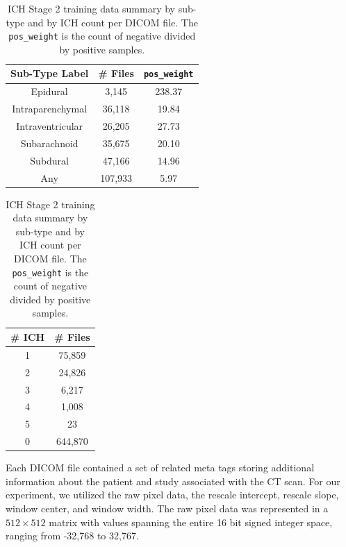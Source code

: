 \documentclass[runningheads]{llncs}
\begin{document}
\begin{table}[htbp]
    \centering
    \caption{ICH Stage 2 training data summary by sub-type and by ICH count per DICOM file. The \texttt{pos\_weight} is the count of negative divided by positive samples.}
    \label{tab:train_by_count}

    \begin{minipage}{.49\linewidth}
        \centering
        \tabcolsep=0.1cm
        \begin{tabular}{|c|c|c|}
            \hline
            Sub-Type Label & \# Files & \texttt{pos\_weight} \\ \hline
            Epidural & 3,145 & 238.37 \\
            Intraparenchymal &  36,118 & 19.84 \\
            Intraventricular &  26,205 & 27.73 \\
            Subarachnoid & 35,675 & 20.10 \\
            Subdural & 47,166 & 14.96 \\
            Any & 107,933 & 5.97 \\ \hline
        \end{tabular}
    \end{minipage}
    \begin{minipage}{.49\linewidth}
        \centering
        \tabcolsep=0.21cm
        \begin{tabular}{|c|c|}
            \hline
            \# ICH & \# Files \\ \hline
            1 & 75,859 \\
            2 & 24,826 \\
            3 &  6,217 \\
            4 &  1,008 \\
            5 &     23 \\
            0 & 644,870 \\ \hline
        \end{tabular}
    \end{minipage}
\end{table}

Each DICOM file contained a set of related meta tags storing additional information about the patient and study associated with the CT scan.
For our experiment, we utilized the raw pixel data, the rescale intercept, rescale slope, window center, and window width.
The raw pixel data was represented in a $512 \times 512$ matrix with values spanning the entire 16 bit signed integer space, ranging from -32,768 to 32,767.
\end{document}
